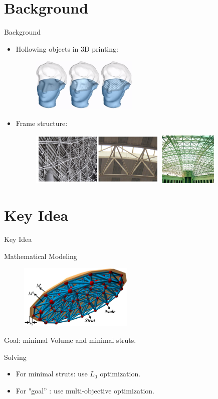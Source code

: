 \documentclass{beamer}
\begin{document}
\section{Background}
\begin{frame}{Background}
\begin{itemize}
\item Hollowing objects in 3D printing:
\begin{figure}[!htb]
\centering
\includegraphics[height=1.0in]{./img/Hollowing.png}
\end{figure}
\item Frame structure:
\begin{figure}[!htb]
\centering
\includegraphics[height=1.0in]{./img/frame-structure.png}
\includegraphics[height=1.0in]{./img/frame-structure-2.png}
\end{figure}
\end{itemize}
\end{frame}

\section{Key Idea}
\begin{frame}{Key Idea}
\begin{block}{Mathematical Modeling}
\begin{figure}[htb]
\centering
\includegraphics[height=1.2in]{./img/skin-frame.png}
\end{figure}
Goal: minimal Volume and minimal struts.
\end{block}

\begin{block}{Solving}
\begin{itemize}
\item For minimal struts: use $\mathit{L}_0$ optimization.
\item For "goal'' : use multi-objective optimization.
\end{itemize}
\end{block}
\end{frame}
\end{document}
